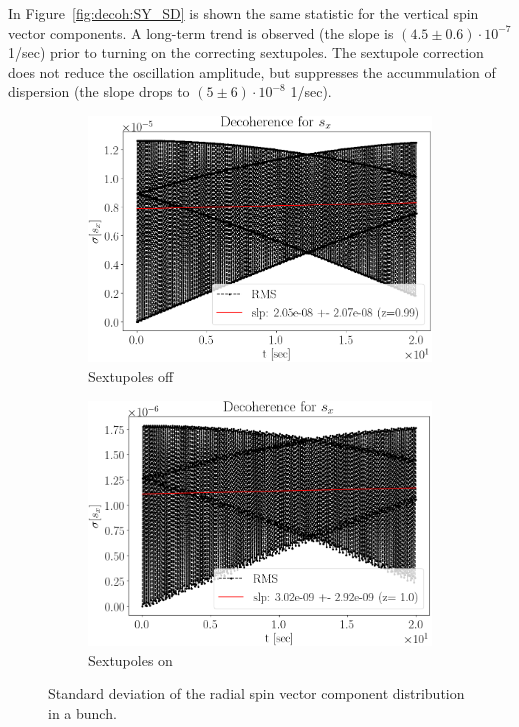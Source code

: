 In Figure~\ref{fig:decoh:SY_SD} is shown the same statistic for the vertical spin vector components.
A long-term trend is observed (the slope is $(4.5 \pm 0.6)\cdot 10^{-7}$ 1/sec) prior to turning on
the correcting sextupoles. The sextupole correction does not reduce the oscillation amplitude, 
but suppresses the accummulation of dispersion (the slope drops to $(5\pm 6)\cdot 10^{-8}$ 1/sec).

\begin{figure}[h!]
	\centering
	\begin{subfigure}{\linewidth}
		\includegraphics[height=.35\paperheight]{images/decoh_sim/SX_decoh_20sec_unopt}
		\caption{Sextupoles off}
	\end{subfigure}
	\begin{subfigure}{\linewidth}
		\includegraphics[height=.35\paperheight]{images/decoh_sim/SX_decoh_20sec_opt}
		\caption{Sextupoles on}
	\end{subfigure}
	\caption{Standard deviation of the radial spin vector component distribution in a bunch.\label{fig:decoh:SX_SD}}
\end{figure}

